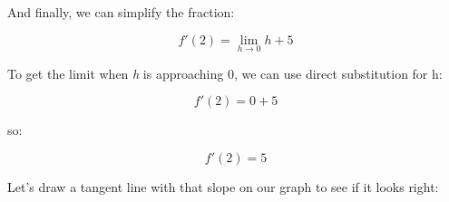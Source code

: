 \documentclass[11pt]{article}
\begin{document}
And finally, we can simplify the fraction:

\begin{equation}f'(2) = \lim_{h \to 0} h + 5 \end{equation}

To get the limit when \emph{h} is approaching 0, we can use direct
substitution for h:

\begin{equation}f'(2) = 0 + 5 \end{equation}

so:

\begin{equation}f'(2) = 5 \end{equation}

Let's draw a tangent line with that slope on our graph to see if it
looks right:
\end{document}
